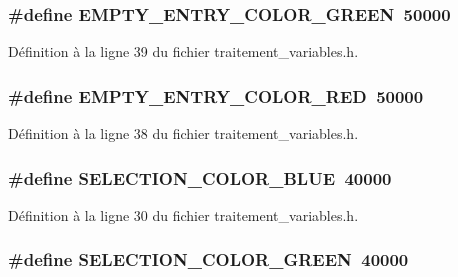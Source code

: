 \subsubsection[{EMPTY\_\-ENTRY\_\-COLOR\_\-GREEN}]{\setlength{\rightskip}{0pt plus 5cm}\#define EMPTY\_\-ENTRY\_\-COLOR\_\-GREEN~50000}\label{traitement__variables_8h_a58a3bef09162e0d393ce6dbabe1f3b7c}


Définition à la ligne 39 du fichier traitement\_\-variables.h.

\subsubsection[{EMPTY\_\-ENTRY\_\-COLOR\_\-RED}]{\setlength{\rightskip}{0pt plus 5cm}\#define EMPTY\_\-ENTRY\_\-COLOR\_\-RED~50000}\label{traitement__variables_8h_a05ad5156a486db023475b39769ccaca2}


Définition à la ligne 38 du fichier traitement\_\-variables.h.

\subsubsection[{SELECTION\_\-COLOR\_\-BLUE}]{\setlength{\rightskip}{0pt plus 5cm}\#define SELECTION\_\-COLOR\_\-BLUE~40000}\label{traitement__variables_8h_a095be9c357f54e5410ddd9551c8dd463}


Définition à la ligne 30 du fichier traitement\_\-variables.h.

\subsubsection[{SELECTION\_\-COLOR\_\-GREEN}]{\setlength{\rightskip}{0pt plus 5cm}\#define SELECTION\_\-COLOR\_\-GREEN~40000}\label{traitement__variables_8h_a0754adfbb35cdb0585d5f8e066e87fa3}


